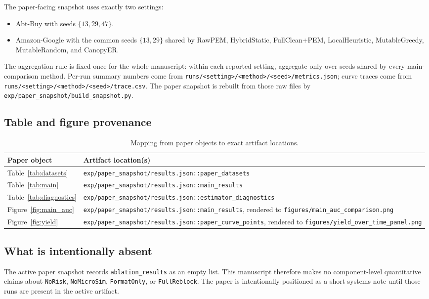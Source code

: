 \documentclass{article}
\newcommand{\method}{CanopyER}
\begin{document}
The paper-facing snapshot uses exactly two settings:
\begin{itemize}
  \item Abt-Buy with seeds $\{13,29,47\}$.
  \item Amazon-Google with the common seeds $\{13,29\}$ shared by RawPEM, HybridStatic, FullClean+PEM, LocalHeuristic, MutableGreedy, MutableRandom, and \method{}.
\end{itemize}
The aggregation rule is fixed once for the whole manuscript: within each reported setting, aggregate only over seeds shared by every main-comparison method. Per-run summary numbers come from \texttt{runs/<setting>/<method>/<seed>/metrics.json}; curve traces come from \texttt{runs/<setting>/<method>/<seed>/trace.csv}. The paper snapshot is rebuilt from those raw files by \texttt{exp/paper\_snapshot/build\_snapshot.py}.

\subsection{Table and figure provenance}

\begin{table}[h]
\caption{Mapping from paper objects to exact artifact locations.}
\label{tab:artifact-map}
\centering
\small
\begin{tabularx}{\linewidth}{lX}
\toprule
Paper object & Artifact location(s) \\
\midrule
Table~\ref{tab:datasets} & \texttt{exp/paper\_snapshot/results.json::paper\_datasets} \\
Table~\ref{tab:main} & \texttt{exp/paper\_snapshot/results.json::main\_results} \\
Table~\ref{tab:diagnostics} & \texttt{exp/paper\_snapshot/results.json::estimator\_diagnostics} \\
Figure~\ref{fig:main_auc} & \texttt{exp/paper\_snapshot/results.json::main\_results}, rendered to \texttt{figures/main\_auc\_comparison.png} \\
Figure~\ref{fig:yield} & \texttt{exp/paper\_snapshot/results.json::paper\_curve\_points}, rendered to \texttt{figures/yield\_over\_time\_panel.png} \\
\bottomrule
\end{tabularx}
\end{table}

\subsection{What is intentionally absent}

The active paper snapshot records \texttt{ablation\_results} as an empty list. This manuscript therefore makes no component-level quantitative claims about \texttt{NoRisk}, \texttt{NoMicroSim}, \texttt{FormatOnly}, or \texttt{FullReblock}. The paper is intentionally positioned as a short systems note until those runs are present in the active artifact.
\end{document}
